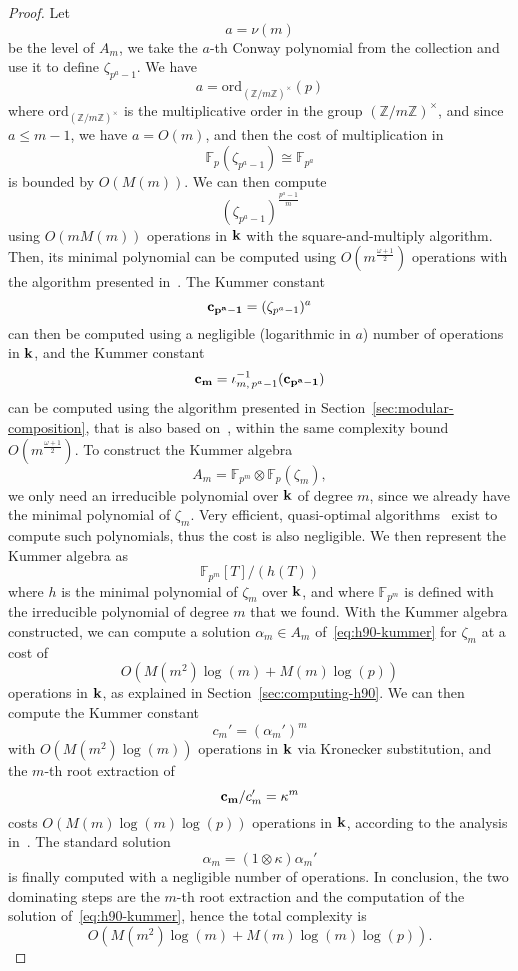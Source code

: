 \begin{proof}
Let 
\[
  a = \nu(m)
\]
be the level of $A_m$, we take the $a$-th Conway polynomial from the collection
and use it to define $\zeta_{p^a-1}$. We have
\[
  a = \mathrm{ord}_{(\mathbb{Z}/m\mathbb{Z})^\times}(p)
\]
where $\mathrm{ord}_{(\mathbb{Z}/m\mathbb{Z})^\times}$ is the multiplicative
order in the group $(\mathbb{Z}/m\mathbb{Z})^\times$, and since $a\leq m-1$, we
have $a=O(m)$, and then the cost of multiplication in
\[
  \mathbb{F}_p(\zeta_{p^a-1}) \cong \mathbb{F}_{p^{a}}
\]
is bounded by $O(M(m))$. We can then compute 
\[
  (\zeta_{p^a-1})^{\frac{p^a-1}{m}}
\]
using $O(mM(m))$ operations in $\mathbf{k}$ with the square-and-multiply algorithm.
Then, its minimal polynomial can be computed using $O(m^{\frac{\omega+1}{2}})$
operations with the algorithm presented in~\cite{Shoup94}. The Kummer constant
\[
  \mathbf{c_{p^a-1}} = (\zeta_{p^a-1})^a
\]
can then be computed using a negligible (logarithmic in $a$) number of
operations in $\mathbf{k}$, and the Kummer constant
\[
  \mathbf{c_{m}} = \iota_{m,\, p^a-1}^{-1}(\mathbf{c_{p^a-1}})
\]
can be computed using the algorithm presented in
Section~\ref{sec:modular-composition}, that is also based on~\cite{Shoup94},
within the same complexity bound $O(m^{\frac{\omega+1}{2}})$.
To construct the Kummer algebra
\[
  A_m = \mathbb{F}_{p^{m}}\otimes\mathbb{F}_p(\zeta_m),
\]
we only need an irreducible polynomial over $\mathbf{k}$ of degree $m$, since we
already have the minimal polynomial of $\zeta_m$. Very efficient, quasi-optimal
algorithms~\cite{BFSS06, CL13, DDS13} exist to compute such polynomials, thus
the cost is also negligible. We then represent the Kummer algebra as
\[
  \mathbb{F}_{p^{m}}[T]/(h(T))
\]
where $h$ is the minimal polynomial of $\zeta_m$ over $\mathbf{k}$, and where
$\mathbb{F}_{p^{m}}$ is defined with the irreducible polynomial of degree $m$
that we found.
With the Kummer algebra constructed, we can
compute a solution $\alpha_m\in A_m$ of~\eqref{eq:h90-kummer} for $\zeta_m$ at
a cost of 
\[
  O(M(m^2)\log(m)+M(m)\log(p))
\]
operations in
$\mathbf{k}$, as explained in Section~\ref{sec:computing-h90}. We can then compute the
Kummer constant
\[
  c_m' = (\alpha_m')^m
\]
with $O(M(m^2)\log(m))$ operations in $\mathbf{k}$ via Kronecker substitution, and the
$m$-th root extraction of
\[
  \mathbf{c_{m}}/c_m' = \kappa^m
\]
costs $O(M(m)\log(m)\log(p))$ operations in $\mathbf{k}$, according to the analysis
in~\cite{BDDFS17}. The standard solution
\[
  \alpha_m = (1\otimes\kappa)\alpha_m'
\]
is finally computed with a negligible number of operations. In conclusion, the
two dominating steps are the $m$-th root extraction and the computation of the
solution of~\eqref{eq:h90-kummer}, hence the total complexity is
\[
  O(M(m^2)\log(m)+M(m)\log(m)\log(p)).
\]
\end{proof}
